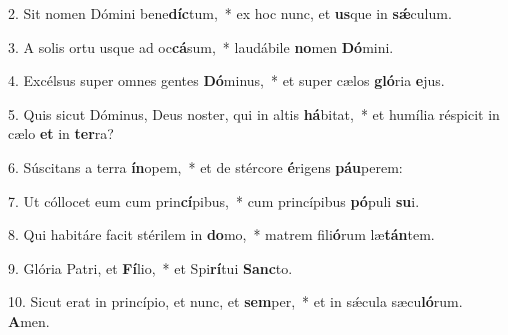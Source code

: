 2. Sit nomen Dómini bene\textbf{díc}tum,~*  ex hoc nunc, et \textbf{us}que in \textbf{sǽ}culum.\

3. A solis ortu usque ad oc\textbf{cá}sum,~*  laudábile \textbf{no}men \textbf{Dó}mini.\

4. Excélsus super omnes gentes \textbf{Dó}minus,~*  et super cælos \textbf{gló}ria \textbf{e}jus.\

5. Quis sicut Dóminus, Deus noster, qui in altis \textbf{há}bitat,~*  et humília réspicit in cælo \textbf{et} in \textbf{ter}ra?\

6. Súscitans a terra \textbf{ín}opem,~*  et de stércore \textbf{é}rigens \textbf{páu}perem:\

7. Ut cóllocet eum cum prin\textbf{cí}pibus,~*  cum princípibus \textbf{pó}puli \textbf{su}i.\

8. Qui habitáre facit stérilem in \textbf{do}mo,~*  matrem fili\textbf{ó}rum læ\textbf{tán}tem.\

9. Glória Patri, et \textbf{Fí}lio,~*  et Spi\textbf{rí}tui \textbf{Sanc}to.\

10. Sicut erat in princípio, et nunc, et \textbf{sem}per,~*  et in sǽcula sæcu\textbf{ló}rum. \textbf{A}men.\

